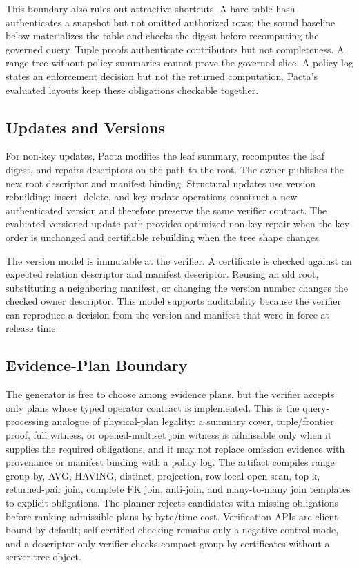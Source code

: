 \documentclass[conference]{IEEEtran}
\newcommand{\sys}{Pacta\xspace}
\begin{document}
This boundary also rules out attractive shortcuts. A bare table hash authenticates a snapshot but not omitted authorized rows; the sound baseline below materializes the table and checks the digest before recomputing the governed query. Tuple proofs authenticate contributors but not completeness. A range tree without policy summaries cannot prove the governed slice. A policy log states an enforcement decision but not the returned computation. \sys's evaluated layouts keep these obligations checkable together.

\subsection{Updates and Versions}
For non-key updates, \sys modifies the leaf summary, recomputes the leaf digest, and repairs descriptors on the path to the root. The owner publishes the new root descriptor and manifest binding. Structural updates use version rebuilding: insert, delete, and key-update operations construct a new authenticated version and therefore preserve the same verifier contract. The evaluated versioned-update path provides optimized non-key repair when the key order is unchanged and certifiable rebuilding when the tree shape changes.

The version model is immutable at the verifier. A certificate is checked against an expected relation descriptor and manifest descriptor. Reusing an old root, substituting a neighboring manifest, or changing the version number changes the checked owner descriptor. This model supports auditability because the verifier can reproduce a decision from the version and manifest that were in force at release time.

\subsection{Evidence-Plan Boundary}
The generator is free to choose among evidence plans, but the verifier accepts only plans whose typed operator contract is implemented. This is the query-processing analogue of physical-plan legality: a summary cover, tuple/frontier proof, full witness, or opened-multiset join witness is admissible only when it supplies the required obligations, and it may not replace omission evidence with provenance or manifest binding with a policy log. The artifact compiles range group-by, AVG, HAVING, distinct, projection, row-local open scan, top-k, returned-pair join, complete FK join, anti-join, and many-to-many join templates to explicit obligations. The planner rejects candidates with missing obligations before ranking admissible plans by byte/time cost. Verification APIs are client-bound by default; self-certified checking remains only a negative-control mode, and a descriptor-only verifier checks compact group-by certificates without a server tree object.
\end{document}
